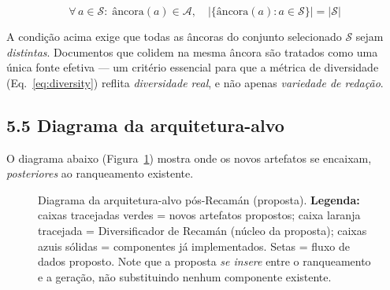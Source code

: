 \begin{equation}
\label{eq:anchor}
\forall\, a \in \mathcal{S}:\; \text{âncora}(a) \in \mathcal{A},\quad
|\{\text{âncora}(a) : a \in \mathcal{S}\}| = |\mathcal{S}|
\end{equation}

\noindent A condição acima exige que todas as âncoras do conjunto selecionado
$\mathcal{S}$ sejam \emph{distintas}. Documentos que colidem na mesma âncora são
tratados como uma única fonte efetiva --- um critério essencial para que a métrica
de diversidade (Eq.~\ref{eq:diversity}) reflita \emph{diversidade real}, e não
apenas \emph{variedade de redação}.

\subsection*{5.5 Diagrama da arquitetura-alvo}

 O diagrama abaixo (Figura~\ref{fig:alvo}) mostra onde os novos artefatos
se encaixam, \emph{posteriores} ao ranqueamento existente.

\begin{figure}[!htb]
\centering
{}
\caption{Diagrama da arquitetura-alvo pós-Recamán (proposta). \textbf{Legenda:}
caixas tracejadas verdes = novos artefatos propostos; caixa laranja tracejada =
Diversificador de Recamán (núcleo da proposta); caixas azuis sólidas = componentes
já implementados. Setas = fluxo de dados proposto. Note que a proposta \emph{se
insere} entre o ranqueamento e a geração, não substituindo nenhum componente
existente.}
\label{fig:alvo}
\end{figure}

